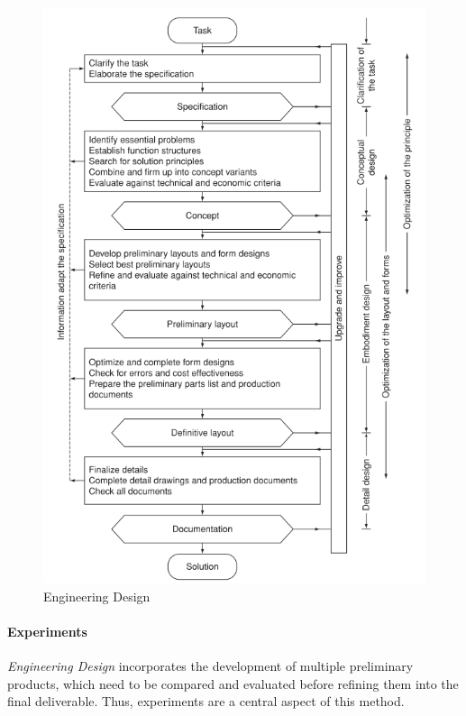 \begin{figure}[htbp]
  \centering
  \includegraphics[width=\linewidth]{images/2_methodology/design_process.png}
  \caption{Engineering Design~\cite{Dym2012,Pahl1984}}
  \label{fig:engineering_design}
\end{figure}

\paragraph{Experiments} \emph{Engineering Design} incorporates the development of
multiple preliminary products, which need to be compared and evaluated before refining
them into the final deliverable. Thus, experiments are a central aspect of this method.


